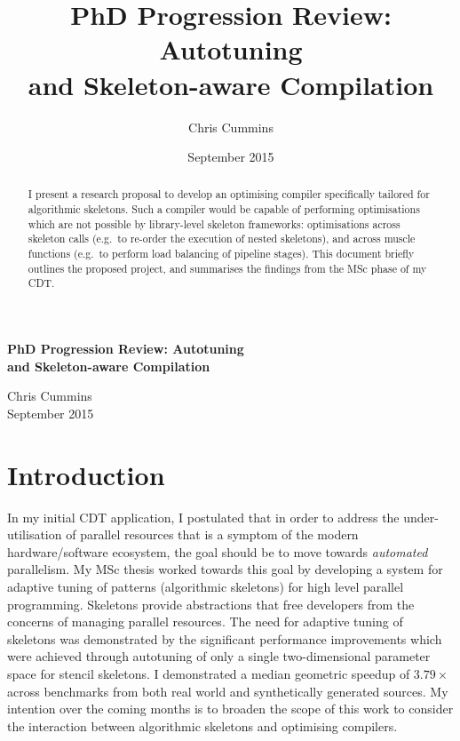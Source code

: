 \documentclass[11pt]{article}
\author{Chris Cummins}
\date{September 2015}
\title{PhD Progression Review: Autotuning\\and Skeleton-aware Compilation}
\begin{document}
\begin{center}
\Large
\textbf{PhD Progression Review: Autotuning\\and Skeleton-aware Compilation}
\vspace{0.2cm}

\normalsize
Chris Cummins\\
September 2015
\vspace{0.2cm}
\end{center}

\begin{abstract}
\noindent
I present a research proposal to develop an optimising compiler
specifically tailored for algorithmic skeletons. Such a compiler would
be capable of performing optimisations which are not possible by
library-level skeleton frameworks: optimisations across skeleton calls
(e.g.\ to re-order the execution of nested skeletons), and across
muscle functions (e.g.\ to perform load balancing of pipeline
stages). This document briefly outlines the proposed project, and
summarises the findings from the MSc phase of my CDT.
\end{abstract}

\section{Introduction}

In my initial CDT application, I postulated that in order to address
the under-utilisation of parallel resources that is a symptom of the
modern hardware/software ecosystem, the goal should be to move towards
\emph{automated} parallelism. My MSc thesis worked towards this goal
by developing a system for adaptive tuning of patterns (algorithmic
skeletons) for high level parallel programming. Skeletons provide
abstractions that free developers from the concerns of managing
parallel resources. The need for adaptive tuning of skeletons was
demonstrated by the significant performance improvements which were
achieved through autotuning of only a single two-dimensional parameter
space for stencil skeletons. I demonstrated a median geometric speedup
of $3.79\times$ across benchmarks from both real world and
synthetically generated sources. My intention over the coming months
is to broaden the scope of this work to consider the interaction
between algorithmic skeletons and optimising compilers.
\end{document}
